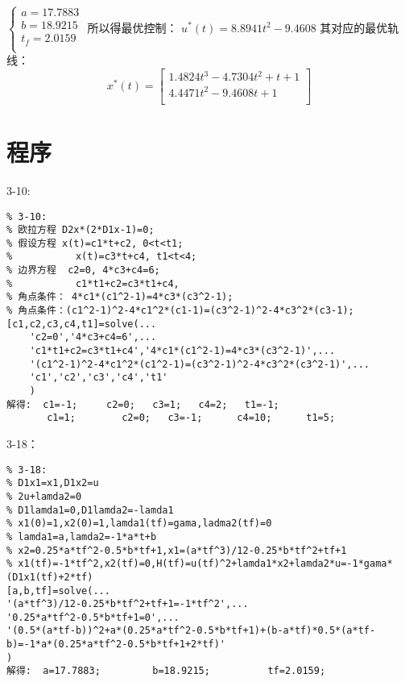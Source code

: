 \documentclass[UTF8]{ctexart}
\begin{document}
$\left\{ \begin{matrix}
   a=17.7883  \\
   b=18.9215  \\
   {{t}_{f}}=2.0159  \\
\end{matrix} \right.$	
所以得最优控制：
				${{u}^{*}}\left( t \right)=8.8941{{t}^{2}}-9.4608$
其对应的最优轨线：
\[{{x}^{*}}\left( t \right)=\left[ \begin{matrix}
   1.4824{{t}^{3}}-4.7304{{t}^{2}}+t+1  \\
   4.4471{{t}^{2}}-9.4608t+1  \\
\end{matrix} \right]\]
\section{程序}
3-10:
\begin{lstlisting}
% 3-10:
% 欧拉方程 D2x*(2*D1x-1)=0;
% 假设方程 x(t)=c1*t+c2, 0<t<t1;
%           x(t)=c3*t+c4, t1<t<4;
% 边界方程  c2=0, 4*c3+c4=6;
%           c1*t1+c2=c3*t1+c4,
% 角点条件： 4*c1*(c1^2-1)=4*c3*(c3^2-1);
% 角点条件：(c1^2-1)^2-4*c1^2*(c1-1)=(c3^2-1)^2-4*c3^2*(c3-1);
[c1,c2,c3,c4,t1]=solve(...
    'c2=0','4*c3+c4=6',...
    'c1*t1+c2=c3*t1+c4','4*c1*(c1^2-1)=4*c3*(c3^2-1)',...
    '(c1^2-1)^2-4*c1^2*(c1^2-1)=(c3^2-1)^2-4*c3^2*(c3^2-1)',...
    'c1','c2','c3','c4','t1'
    )
解得:  c1=-1;		c2=0;  	c3=1;  	c4=2;  	t1=-1;
       c1=1;		c2=0;  	c3=-1;  	c4=10;  	t1=5;
   \end{lstlisting}


3-18：
   \begin{lstlisting}
% 3-18:
% D1x1=x1,D1x2=u
% 2u+lamda2=0
% D1lamda1=0,D1lamda2=-lamda1
% x1(0)=1,x2(0)=1,lamda1(tf)=gama,ladma2(tf)=0
% lamda1=a,lamda2=-1*a*t+b
% x2=0.25*a*tf^2-0.5*b*tf+1,x1=(a*tf^3)/12-0.25*b*tf^2+tf+1
% x1(tf)=-1*tf^2,x2(tf)=0,H(tf)=u(tf)^2+lamda1*x2+lamda2*u=-1*gama*(D1x1(tf)+2*tf)
[a,b,tf]=solve(...
'(a*tf^3)/12-0.25*b*tf^2+tf+1=-1*tf^2',...                      
'0.25*a*tf^2-0.5*b*tf+1=0',...                                        
'(0.5*(a*tf-b))^2+a*(0.25*a*tf^2-0.5*b*tf+1)+(b-a*tf)*0.5*(a*tf-b)=-1*a*(0.25*a*tf^2-0.5*b*tf+1+2*tf)'
) 
解得:  a=17.7883;			b=18.9215;			tf=2.0159;
\end{lstlisting}
\end{document}
